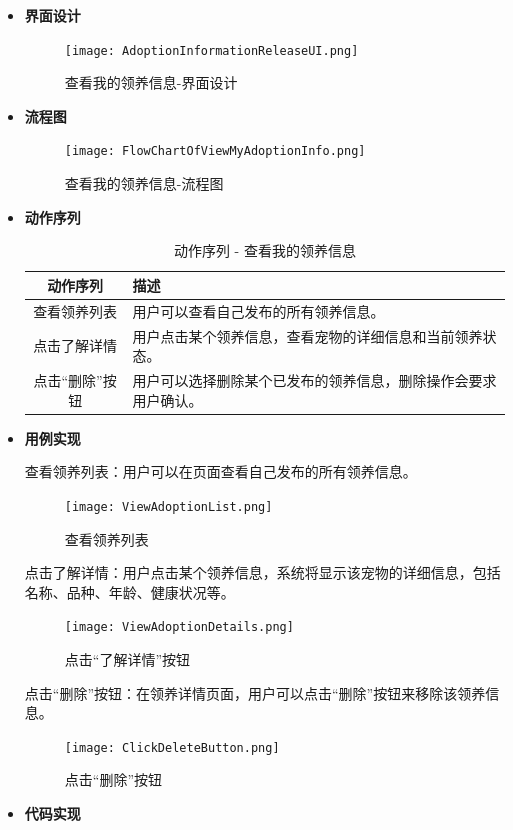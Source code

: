 \begin{itemize}
	\item[] \textbf{界面设计}
	
	\begin{figure}[H]
		\centering
		\texttt{[image: AdoptionInformationReleaseUI.png]} 
		\caption{查看我的领养信息-界面设计}
		\label{fig:View my adoption information UI}
	\end{figure}
	
	\item[] \textbf{流程图}
	\begin{figure}[H]
		\centering
		\texttt{[image: FlowChartOfViewMyAdoptionInfo.png]} 
		\caption{查看我的领养信息-流程图}
		\label{fig:Flow chart of view my adoption information}
	\end{figure}
	
	\item[] \textbf{动作序列}
	
	\begin{table}[H]
		\centering
		\caption{动作序列 - 查看我的领养信息}
		\renewcommand\arraystretch{1.5}
		\begin{tabular}{|c|>{\raggedright\arraybackslash}p{7cm}|}
			\hline
			\textbf{动作序列} & \textbf{描述} \\ \hline
			查看领养列表 & 用户可以查看自己发布的所有领养信息。 \\ \hline
			点击了解详情 & 用户点击某个领养信息，查看宠物的详细信息和当前领养状态。 \\ \hline
			点击“删除”按钮 & 用户可以选择删除某个已发布的领养信息，删除操作会要求用户确认。 \\ \hline
		\end{tabular}
		\label{table:view-my-adoption-info-sequence}
	\end{table}
	
	\item[] \textbf{用例实现}
	
	查看领养列表：用户可以在页面查看自己发布的所有领养信息。
	
	\begin{figure}[H]
		\centering
		\texttt{[image: ViewAdoptionList.png]} 
		\caption{查看领养列表}
		\label{fig:View adoption list}
	\end{figure}
	
	点击了解详情：用户点击某个领养信息，系统将显示该宠物的详细信息，包括名称、品种、年龄、健康状况等。
	
	\begin{figure}[H]
		\centering
		\texttt{[image: ViewAdoptionDetails.png]}
		\caption{点击“了解详情”按钮}
		\label{fig:View adoption details}
	\end{figure}
	
	点击“删除”按钮：在领养详情页面，用户可以点击“删除”按钮来移除该领养信息。
	
	\begin{figure}[H]
		\centering
		\texttt{[image: ClickDeleteButton.png]} 
		\caption{点击“删除”按钮}
		\label{fig:Click delete button}
	\end{figure}
	
	\item[] \textbf{代码实现}
\end{itemize}


